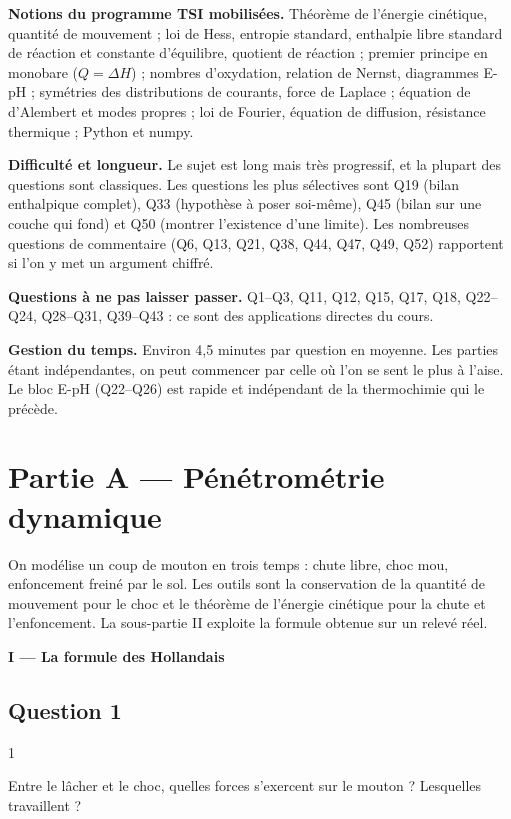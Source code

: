 \documentclass[11pt,a4paper]{article}
\begin{document}
\textbf{Notions du programme TSI mobilisées.} Théorème de l'énergie cinétique, quantité de mouvement ; loi de Hess, entropie standard, enthalpie libre standard de réaction et constante d'équilibre, quotient de réaction ; premier principe en monobare (\(Q = \Delta H\)) ; nombres d'oxydation, relation de Nernst, diagrammes E-pH ; symétries des distributions de courants, force de Laplace ; équation de d'Alembert et modes propres ; loi de Fourier, équation de diffusion, résistance thermique ; Python et numpy.

\textbf{Difficulté et longueur.} Le sujet est long mais très progressif, et la plupart des questions sont classiques. Les questions les plus sélectives sont Q19 (bilan enthalpique complet), Q33 (hypothèse à poser soi-même), Q45 (bilan sur une couche qui fond) et Q50 (montrer l'existence d'une limite). Les nombreuses questions de commentaire (Q6, Q13, Q21, Q38, Q44, Q47, Q49, Q52) rapportent si l'on y met un argument chiffré.

\textbf{Questions à ne pas laisser passer.} Q1--Q3, Q11, Q12, Q15, Q17, Q18, Q22--Q24, Q28--Q31, Q39--Q43 : ce sont des applications directes du cours.

\textbf{Gestion du temps.} Environ 4,5 minutes par question en moyenne. Les parties étant indépendantes, on peut commencer par celle où l'on se sent le plus à l'aise. Le bloc E-pH (Q22--Q26) est rapide et indépendant de la thermochimie qui le précède.

\hypertarget{partie-a-puxe9nuxe9tromuxe9trie-dynamique}{%
\section{Partie A --- Pénétrométrie dynamique}\label{partie-a-puxe9nuxe9tromuxe9trie-dynamique}}

On modélise un coup de mouton en trois temps : chute libre, choc mou, enfoncement freiné par le sol. Les outils sont la conservation de la quantité de mouvement pour le choc et le théorème de l'énergie cinétique pour la chute et l'enfoncement. La sous-partie II exploite la formule obtenue sur un relevé réel.

\textbf{I --- La formule des Hollandais}

\hypertarget{question-1}{%
\subsection{Question 1}\label{question-1}}

\begin{indication}{1}

Entre le lâcher et le choc, quelles forces s'exercent sur le mouton ? Lesquelles travaillent ?

\end{indication}
\end{document}
